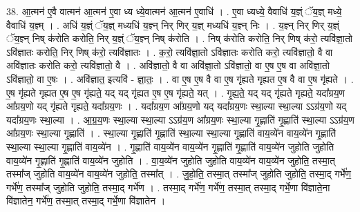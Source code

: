 \documentclass[17pt]{extarticle}
\begin{document}
38. आ॒त्मन॑ ए॒वै वात्मन॑ आ॒त्मन॑ ए॒वा ध्य ध्ये॒वात्मन॑ आ॒त्मन॑ ए॒वाधि॑ । . ए॒वा ध्यध्ये॒ वैवाधि॑ य॒ज्ञ्ं ॅय॒ज्ञ् मध्ये॒ वैवाधि॑ य॒ज्ञ्म् । . अधि॑ य॒ज्ञ्ं ॅय॒ज्ञ् मध्यधि॑ य॒ज्ञ्न् निर् णिर् य॒ज्ञ् मध्यधि॑ य॒ज्ञ्न् निः । . य॒ज्ञ्न् निर् णिर् य॒ज्ञ्ं ॅय॒ज्ञ्न् निष् क॑रोति करोति॒ निर् य॒ज्ञ्ं ॅय॒ज्ञ्न् निष् क॑रोति । . निष् क॑रोति करोति॒ निर् णिष् क॑रो॒ त्यवि॑ज्ञा॒तो ऽवि॑ज्ञातः करोति॒ निर् णिष् क॑रो॒ त्यवि॑ज्ञातः । . क॒रो॒ त्यवि॑ज्ञा॒तो ऽवि॑ज्ञातः करोति करो॒ त्यवि॑ज्ञातो॒ वै वा अवि॑ज्ञातः करोति करो॒ त्यवि॑ज्ञातो॒ वै । . अवि॑ज्ञातो॒ वै वा अवि॑ज्ञा॒तो ऽवि॑ज्ञातो॒ वा ए॒ष ए॒ष वा अवि॑ज्ञा॒तो ऽवि॑ज्ञातो॒ वा ए॒षः । . अवि॑ज्ञात॒ इत्यवि॑ - ज्ञा॒तः॒ । . वा ए॒ष ए॒ष वै वा ए॒ष गृ॑ह्यते गृह्यत ए॒ष वै वा ए॒ष गृ॑ह्यते । . ए॒ष गृ॑ह्यते गृह्यत ए॒ष ए॒ष गृ॑ह्यते॒ यद् यद् गृ॑ह्यत ए॒ष ए॒ष गृ॑ह्यते॒ यत् । . गृ॒ह्य॒ते॒ यद् यद् गृ॑ह्यते गृह्यते॒ यदा᳚ग्रय॒ण आ᳚ग्रय॒णो यद् गृ॑ह्यते गृह्यते॒ यदा᳚ग्रय॒णः । . यदा᳚ग्रय॒ण आ᳚ग्रय॒णो यद् यदा᳚ग्रय॒णः स्था॒ल्या स्था॒ल्या ऽऽग्र॑य॒णो यद् यदा᳚ग्रय॒णः स्था॒ल्या । . आ॒ग्र॒य॒णः स्था॒ल्या स्था॒ल्या ऽऽग्र॑य॒ण आ᳚ग्रय॒णः स्था॒ल्या गृ॒ह्णाति॑ गृ॒ह्णाति॑ स्था॒ल्या ऽऽग्र॑य॒ण आ᳚ग्रय॒णः स्था॒ल्या गृ॒ह्णाति॑ । . स्था॒ल्या गृ॒ह्णाति॑ गृ॒ह्णाति॑ स्था॒ल्या स्था॒ल्या गृ॒ह्णाति॑ वाय॒व्ये॑न वाय॒व्ये॑न गृ॒ह्णाति॑ स्था॒ल्या स्था॒ल्या गृ॒ह्णाति॑ वाय॒व्ये॑न । . गृ॒ह्णाति॑ वाय॒व्ये॑न वाय॒व्ये॑न गृ॒ह्णाति॑ गृ॒ह्णाति॑ वाय॒व्ये॑न जुहोति जुहोति वाय॒व्ये॑न गृ॒ह्णाति॑ गृ॒ह्णाति॑ वाय॒व्ये॑न जुहोति । . वा॒य॒व्ये॑न जुहोति जुहोति वाय॒व्ये॑न वाय॒व्ये॑न जुहोति॒ तस्मा॒त् तस्मा᳚ज् जुहोति वाय॒व्ये॑न वाय॒व्ये॑न जुहोति॒ तस्मा᳚त् । . जु॒हो॒ति॒ तस्मा॒त् तस्मा᳚ज् जुहोति जुहोति॒ तस्मा॒द् गर्भे॑ण॒ गर्भे॑ण॒ तस्मा᳚ज् जुहोति जुहोति॒ तस्मा॒द् गर्भे॑ण । . तस्मा॒द् गर्भे॑ण॒ गर्भे॑ण॒ तस्मा॒त् तस्मा॒द् गर्भे॒णा वि॑ज्ञाते॒ना वि॑ज्ञातेन॒ गर्भे॑ण॒ तस्मा॒त् तस्मा॒द् गर्भे॒णा वि॑ज्ञातेन । \newline
\pagebreak
{}
\end{document}
